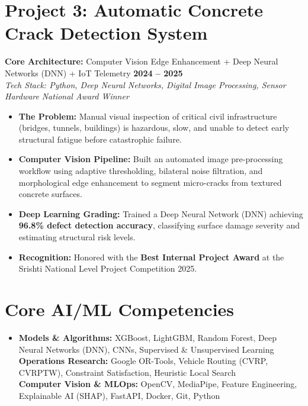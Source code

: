 \documentclass[letterpaper,10pt]{article}
\newcommand{\resumeItem}[1]{
  \item\small{
    {#1 \vspace{-2pt}}
  }
}
\begin{document}
\section{Project 3: Automatic Concrete Crack Detection System}
\textbf{Core Architecture:} Computer Vision Edge Enhancement + Deep Neural Networks (DNN) + IoT Telemetry \hfill \textbf{2024 -- 2025} \\
\textit{\small Tech Stack: Python, Deep Neural Networks, Digital Image Processing, Sensor Hardware} \hfill \textit{\small National Award Winner}

\begin{itemize}
    \resumeItem{\textbf{The Problem:} Manual visual inspection of critical civil infrastructure (bridges, tunnels, buildings) is hazardous, slow, and unable to detect early structural fatigue before catastrophic failure.}
    \resumeItem{\textbf{Computer Vision Pipeline:} Built an automated image pre-processing workflow using adaptive thresholding, bilateral noise filtration, and morphological edge enhancement to segment micro-cracks from textured concrete surfaces.}
    \resumeItem{\textbf{Deep Learning Grading:} Trained a Deep Neural Network (DNN) achieving \textbf{96.8\% defect detection accuracy}, classifying surface damage severity and estimating structural risk levels.}
    \resumeItem{\textbf{Recognition:} Honored with the \textbf{Best Internal Project Award} at the Srishti National Level Project Competition 2025.}
\end{itemize}
\vspace{-2pt}

\section{Core AI/ML Competencies}
\begin{itemize}[leftmargin=0pt, label={}]
    \item \small{
      \textbf{Models \& Algorithms:}{ XGBoost, LightGBM, Random Forest, Deep Neural Networks (DNN), CNNs, Supervised \& Unsupervised Learning} \\
      \textbf{Operations Research:}{ Google OR-Tools, Vehicle Routing (CVRP, CVRPTW), Constraint Satisfaction, Heuristic Local Search} \\
      \textbf{Computer Vision \& MLOps:}{ OpenCV, MediaPipe, Feature Engineering, Explainable AI (SHAP), FastAPI, Docker, Git, Python}
    }
\end{itemize}
\end{document}
